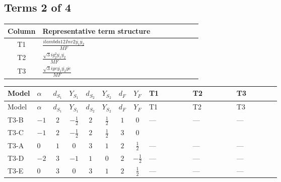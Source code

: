 \documentclass[8pt]{article}
\begin{document}
\begin{landscape}
\subsection*{Terms 2 of 4}
\begin{center}
\begin{tabular}{@{}c >{\raggedright\arraybackslash}p{0.82\linewidth}@{}}
\toprule
Column & Representative term structure \\
\midrule
T1 & \(\displaystyle \frac{i lambda12Inv2 \overline{y_{1}} \overline{y_{2}}}{MF}\) \\
\midrule
T2 & \(\displaystyle \frac{\sqrt{3} i g_{2}^{2} \overline{y_{1}} \overline{y_{2}}}{MF}\) \\
\midrule
T3 & \(\displaystyle \frac{\sqrt{3} i ye \overline{y_{1}} \overline{y_{2}} \overline{ye}}{MF}\) \\
\midrule
\bottomrule
\end{tabular}
\end{center}
\smallskip
\tiny
\begin{longtable}{@{}llcccccc >{\raggedright\arraybackslash}p{0.21\linewidth} >{\raggedright\arraybackslash}p{0.21\linewidth} >{\raggedright\arraybackslash}p{0.21\linewidth}@{}}
\toprule
Model & $\alpha$ & $d_{S_1}$ & $Y_{S_1}$ & $d_{S_2}$ & $Y_{S_2}$ & $d_F$ & $Y_F$ & T1 & T2 & T3 \\
\midrule
\endfirsthead
\toprule
Model & $\alpha$ & $d_{S_1}$ & $Y_{S_1}$ & $d_{S_2}$ & $Y_{S_2}$ & $d_F$ & $Y_F$ & T1 & T2 & T3 \\
\midrule
\endhead
T3-B & $-1$ & $2$ & $-\frac{1}{2}$ & $2$ & $\frac{1}{2}$ & $1$ & $0$ & --- & --- & --- \\
\midrule
T3-C & $-1$ & $2$ & $-\frac{1}{2}$ & $2$ & $\frac{1}{2}$ & $3$ & $0$ & \scriptsize\adjustbox{max width=\linewidth}{$\begin{gathered} \frac{i lambda12Inv2 \overline{y_{1}} \overline{y_{2}}}{3 MF}\end{gathered}$} & \scriptsize\adjustbox{max width=\linewidth}{$\begin{gathered} \frac{\sqrt{3} i g_{2}^{2} \overline{y_{1}} \overline{y_{2}}}{4 MF}\end{gathered}$} & \scriptsize\adjustbox{max width=\linewidth}{$\begin{gathered} - \frac{\sqrt{3} i ye \overline{y_{1}} \overline{y_{2}} \overline{ye}}{12 MF}\end{gathered}$} \\
\midrule
T3-A & $0$ & $1$ & $0$ & $3$ & $1$ & $2$ & $\frac{1}{2}$ & --- & --- & --- \\
\midrule
T3-D & $-2$ & $3$ & $-1$ & $1$ & $0$ & $2$ & $-\frac{1}{2}$ & --- & --- & --- \\
\midrule
T3-E & $0$ & $3$ & $0$ & $3$ & $1$ & $2$ & $\frac{1}{2}$ & --- & --- & --- \\
\midrule
\bottomrule
\end{longtable}
\clearpage

\end{landscape}
\end{document}
